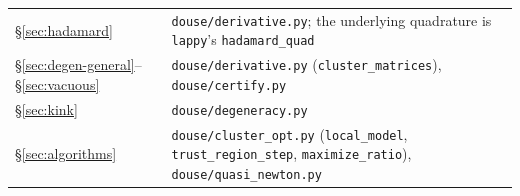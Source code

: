 \documentclass[11pt]{article}
\newcommand{\code}[1]{\texttt{#1}}
\theoremstyle{plain}
\begin{document}
\noindent\begin{tabularx}{\textwidth}{@{}lL@{}}
\toprule
\S\ref{sec:hadamard} & \code{douse/derivative.py}; the underlying quadrature is \code{lappy}'s
  \code{hadamard\_quad} \\
\S\ref{sec:degen-general}--\S\ref{sec:vacuous} & \code{douse/derivative.py}
  (\code{cluster\_matrices}), \code{douse/certify.py} \\
\S\ref{sec:kink} & \code{douse/degeneracy.py} \\
\S\ref{sec:algorithms} & \code{douse/cluster\_opt.py} (\code{local\_model},
  \code{trust\_region\_step}, \code{maximize\_ratio}), \code{douse/quasi\_newton.py} \\
\bottomrule
\end{tabularx}
\end{document}

